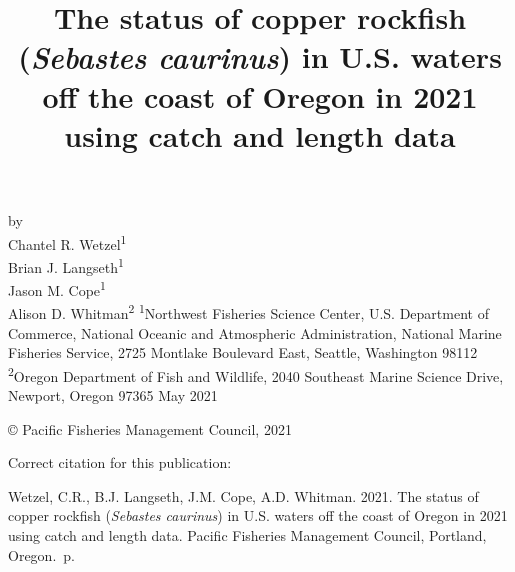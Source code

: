 \documentclass[11pt,
  english,
  a4paper,
]{article}
\date{}
\newcommand{\trTitle}{The status of copper rockfish (\emph{Sebastes caurinus}) in U.S. waters off the coast of Oregon in 2021 using catch and length data}
\newcommand{\trYear}{2021}
\newcommand{\trMonth}{May}
\newcommand{\trAuthsBack}{Wetzel, C.R., B.J. Langseth, J.M. Cope, A.D. Whitman}
\newcommand{\trCitation}{
\begin{hangparas}{1em}{1}
\trAuthsBack{}. \trYear{}. \trTitle{}. Pacific Fisheries Management Council, Portland, Oregon. \pageref{LastPage}{}\,p.
\end{hangparas}}
\begin{document}

\renewcommand*{\thefootnote}{\fnsymbol{footnote}}

\small
\thispagestyle{empty}
\noindent
\begin{center}
\title{The status of copper rockfish (\emph{Sebastes caurinus}) in U.S. waters off the coast of Oregon in 2021 using catch and length data}
\vspace{1.5cm}
{\Large\textbf{}}
\vfill
by\\
Chantel R. Wetzel\textsuperscript{1}\\
Brian J. Langseth\textsuperscript{1}\\
Jason M. Cope\textsuperscript{1}\\
Alison D. Whitman\textsuperscript{2}\vfill
\textsuperscript{1}Northwest Fisheries Science Center, U.S. Department of Commerce, National Oceanic and Atmospheric Administration, National Marine Fisheries Service, 2725 Montlake Boulevard East, Seattle, Washington 98112\\
\textsuperscript{2}Oregon Department of Fish and Wildlife, 2040 Southeast Marine Science Drive, Newport, Oregon 97365\vfill
\trMonth{} \trYear{}
\end{center}
\clearpage

\thispagestyle{empty}
\vspace*{\fill}
\begin{center}
\copyright{} Pacific Fisheries Management Council, \trYear{}\\
\end{center}
\par
\bigskip
\noindent
Correct citation for this publication:
\bigskip
\par
\trCitation{}
\clearpage


\tableofcontents\clearpage
\label{TRlastRoman}
\clearpage

\newpage
\thispagestyle{empty} %

\pagestyle{plain}  %
\renewcommand*{\thefootnote}{\arabic{footnote}}  %
\setcounter{footnote}{0}  %
\renewcommand{\headrulewidth}{0.5pt}
\renewcommand{\footrulewidth}{0.5pt}
\end{document}
